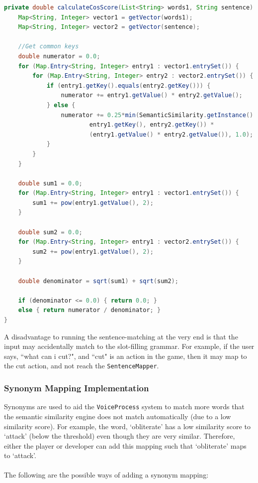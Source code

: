 \documentclass[11pt]{article}
\begin{document}
\begin{lstlisting}[language=Java, caption=SentenceMapper.calculateCosScore(), label=lst:cos-score]
private double calculateCosScore(List<String> words1, String sentence) {
    Map<String, Integer> vector1 = getVector(words1);
    Map<String, Integer> vector2 = getVector(sentence);

    //Get common keys
    double numerator = 0.0;
    for (Map.Entry<String, Integer> entry1 : vector1.entrySet()) {
        for (Map.Entry<String, Integer> entry2 : vector2.entrySet()) {
            if (entry1.getKey().equals(entry2.getKey())) {
                numerator += entry1.getValue() * entry2.getValue();
            } else {
                numerator += 0.25*min(SemanticSimilarity.getInstance().calculateScore(
                        entry1.getKey(), entry2.getKey()) *
                        (entry1.getValue() * entry2.getValue()), 1.0);
            }
        }
    }

    double sum1 = 0.0;
    for (Map.Entry<String, Integer> entry1 : vector1.entrySet()) {
        sum1 += pow(entry1.getValue(), 2);
    }

    double sum2 = 0.0;
    for (Map.Entry<String, Integer> entry1 : vector2.entrySet()) {
        sum2 += pow(entry1.getValue(), 2);
    }

    double denominator = sqrt(sum1) + sqrt(sum2);

    if (denominator <= 0.0) { return 0.0; }
    else { return numerator / denominator; }
}
\end{lstlisting}

A disadvantage to running the sentence-matching at the very end is that the input may accidentally match to the slot-filling grammar. For example, if the user says, ``what can i cut?", and ``cut" is an action in the game, then it may map to the cut action, and not reach the \texttt{SentenceMapper}.

\subsubsection{Synonym Mapping Implementation}

Synonyms are used to aid the \texttt{VoiceProcess} system to match more words that the semantic similarity engine does not match automatically (due to a low similarity score). For example, the word, `obliterate' has a low similarity score to `attack' (below the threshold) even though they are very similar. Therefore, either the player or developer can add this mapping such that `obliterate' maps to `attack'.
\\
\\
The following are the possible ways of adding a synonym mapping:
\end{document}
